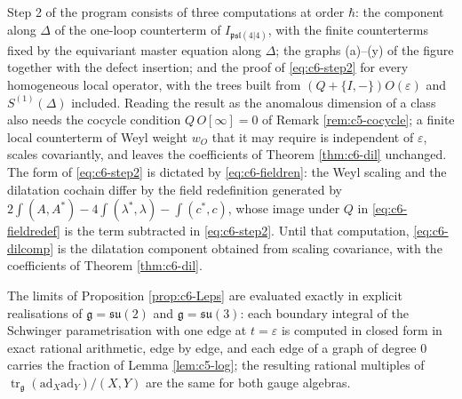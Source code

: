 \begin{remark}[Step 2]
\label{rem:c6-step2}
Step 2 of the program consists of three computations at order $\hbar$: the component along $\Delta$ of the one-loop counterterm of $I_{\mathfrak{psl}(4|4)}$, with the finite counterterms fixed by the equivariant master equation along $\Delta$; the graphs (a)--(y) of the figure together with the defect insertion; and the proof of \eqref{eq:c6-step2} for every homogeneous local operator, with the trees built from $(Q+\{I,-\})O(\varepsilon)$ and $S^{(1)}(\Delta)$ included. Reading the result as the anomalous dimension of a class also needs the cocycle condition $Q\,O[\infty]=0$ of Remark \ref{rem:c5-cocycle}; a finite local counterterm of Weyl weight $w_O$ that it may require is independent of $\varepsilon$, scales covariantly, and leaves the coefficients of Theorem \ref{thm:c6-dil} unchanged. The form of \eqref{eq:c6-step2} is dictated by \eqref{eq:c6-fieldren}: the Weyl scaling and the dilatation cochain differ by the field redefinition generated by $2\int(A,A^*)-4\int(\lambda^*,\lambda)-\int(c^*,c)$, whose image under $Q$ in \eqref{eq:c6-fieldredef} is the term subtracted in \eqref{eq:c6-step2}. Until that computation, \eqref{eq:c6-dilcomp} is the dilatation component obtained from scaling covariance, with the coefficients of Theorem \ref{thm:c6-dil}.
\end{remark}

\begin{remark}
\label{rem:c6-verification}
The limits of Proposition \ref{prop:c6-Leps} are evaluated exactly in explicit realisations of $\mathfrak g=\mathfrak{su}(2)$ and $\mathfrak g=\mathfrak{su}(3)$: each boundary integral of the Schwinger parametrisation with one edge at $t=\varepsilon$ is computed in closed form in exact rational arithmetic, edge by edge, and each edge of a graph of degree $0$ carries the fraction of Lemma \ref{lem:c5-log}; the resulting rational multiples of $\operatorname{tr}_{\mathfrak g}(\mathrm{ad}_X\mathrm{ad}_Y)/(X,Y)$ are the same for both gauge algebras.
\end{remark}
